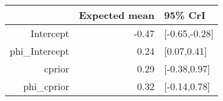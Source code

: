 \begin{tabular}{rrl}
  \hline
 & Expected mean & 95\% CrI \\ 
  \hline
Intercept & -0.47 & [-0.65,-0.28] \\ 
  phi\_Intercept & 0.24 & [0.07,0.41] \\ 
  cprior & 0.29 & [-0.38,0.97] \\ 
  phi\_cprior & 0.32 & [-0.14,0.78] \\ 
   \hline
\end{tabular}

